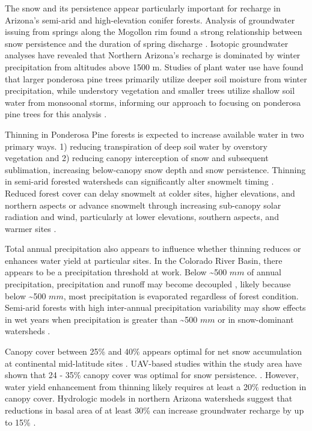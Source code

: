 \documentclass[
  number,
  preprint,
  3p,
  onecolumn]{elsarticle}
\begin{document}
The snow and its persistence appear particularly important for recharge
in Arizona's semi-arid and high-elevation conifer forests. Analysis of
groundwater issuing from springs along the Mogollon rim found a strong
relationship between snow persistence and the duration of spring
discharge \citep{donovan2022}. Isotopic groundwater analyses have
revealed that Northern Arizona's recharge is dominated by winter
precipitation from altitudes above 1500
m\citep{eastoe2007, eastoe2023, earman2006, blasch2006}. Studies of
plant water use have found that larger ponderosa pine trees primarily
utilize deeper soil moisture from winter precipitation, while understory
vegetation and smaller trees utilize shallow soil water from monsoonal
storms, informing our approach to focusing on ponderosa pine trees for
this analysis \citep{kerhoulas2013, kerhoulas2023}.

Thinning in Ponderosa Pine forests is expected to increase available
water in two primary ways. 1) reducing transpiration of deep soil water
by overstory vegetation and 2) reducing canopy interception of snow and
subsequent sublimation, increasing below-canopy snow depth and snow
persistence. Thinning in semi-arid forested watersheds can significantly
alter snowmelt timing \citep{dwivedi2024}. Reduced forest cover can
delay snowmelt at colder sites, higher elevations, and northern aspects
or advance snowmelt through increasing sub-canopy solar radiation and
wind, particularly at lower elevations, southern aspects, and warmer
sites \citep{biederman_recent_2015, dwivedi2024}.

Total annual precipitation also appears to influence whether thinning
reduces or enhances water yield at particular sites. In the Colorado
River Basin, there appears to be a precipitation threshold at work.
Below \textasciitilde500 \(mm\) of annual precipitation, precipitation
and runoff may become decoupled \citep{biederman2022}, likely because
below \textasciitilde500 \(mm\), most precipitation is evaporated
regardless of forest condition. Semi-arid forests with high inter-annual
precipitation variability may show effects in wet years when
precipitation is greater than \textasciitilde500 \(mm\) or in
snow-dominant watersheds
\citep{adams_ecohydrological_2012, carroll_evaluating_2016}.

Canopy cover between 25\% and 40\% appears optimal for net snow
accumulation at continental mid-latitude sites \citep{veatch2009}.
UAV-based studies within the study area have shown that 24 - 35\% canopy
cover was optimal for snow persistence.
\citep{donager2021, sankey_multi-scale_2015, belmonte2021}. However,
water yield enhancement from thinning likely requires at least a 20\%
reduction in canopy cover\citep{adams_ecohydrological_2012}. Hydrologic
models in northern Arizona watersheds suggest that reductions in basal
area of at least 30\% can increase groundwater recharge by up to 15\%
\citep{wyatt2015}.
\end{document}
